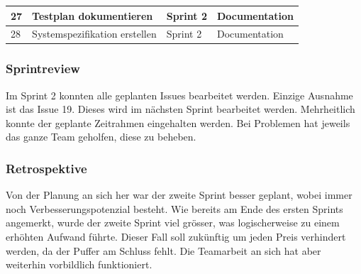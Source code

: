 \documentclass[11pt]{article}
\begin{document}
\begin{table}[!h]
{\begin{tabular}{@{}llll@{}}
			\multicolumn{1}{|l|}{27}  & \multicolumn{1}{l|}{Testplan dokumentieren}                               & \multicolumn{1}{l|}{Sprint 2}              & \multicolumn{1}{l|}{Documentation}       \\ \midrule
			\multicolumn{1}{|l|}{28}  & \multicolumn{1}{l|}{Systemspezifikation erstellen}                               & \multicolumn{1}{l|}{Sprint 2}              & \multicolumn{1}{l|}{Documentation}       \\ \midrule
		\end{tabular}%
	}
\end{table}\newpage


\subsubsection{Sprintreview}
Im Sprint 2 konnten alle geplanten Issues bearbeitet werden. Einzige Ausnahme ist das Issue 19. Dieses wird im nächsten Sprint bearbeitet werden. Mehrheitlich konnte der geplante Zeitrahmen eingehalten werden. Bei Problemen hat jeweils das ganze Team geholfen, diese zu beheben. 
\begin{table}[!h]
\end{table} 



\subsubsection{Retrospektive}
Von der Planung an sich her war der zweite Sprint besser geplant, wobei immer noch Verbesserungspotenzial besteht. Wie bereits am Ende des ersten Sprints angemerkt, wurde der zweite Sprint viel grösser, was logischerweise zu einem erhöhten Aufwand führte. Dieser Fall soll zukünftig um jeden Preis verhindert werden, da der Puffer am Schluss fehlt. Die Teamarbeit an sich hat aber weiterhin vorbildlich funktioniert. 
\end{document}
